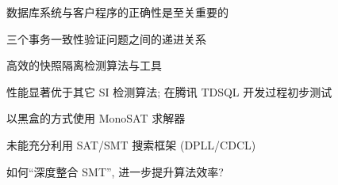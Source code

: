 
\begin{frame}{}
	\begin{center}
		数据库系统与客户程序的正确性是至关重要的


		{\small 三个事务一致性验证问题之间的递进关系}
	\end{center}
\end{frame}

\begin{frame}{}
  \begin{center}
     高效的快照隔离检测算法与工具~

  \end{center}
\end{frame}

\begin{frame}{}
  \begin{center}
  \end{center}
\end{frame}

\begin{frame}{}
	\centerline{性能显著优于其它 SI 检测算法; 在腾讯 TDSQL 开发过程初步测试}

\end{frame}

\begin{frame}{}
	\begin{center}
		\polysi{} 以黑盒的方式使用 MonoSAT 求解器

		\vspace{0.30cm}
		\vspace{0.30cm}

		未能充分利用 SAT/SMT 搜索框架 (DPLL/CDCL)
	\end{center}
\end{frame}

\begin{frame}{}
	\begin{center}
		 如何``深度整合 SMT'', 进一步提升算法效率?

		\vspace{0.50cm}
	\end{center}
\end{frame}


